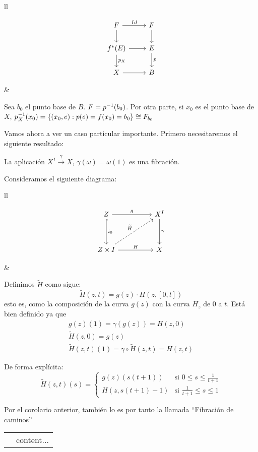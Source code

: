 \begin{tabular}{ll}
\begin{minipage}{0.3\textwidth}
\[
\begin{tikzcd}
F \rar{Id} \dar & F \dar \\
f^*(E) \rar \dar{p_X}  & E \dar{p} \\
X \rar & B
\end{tikzcd}
\]
\end{minipage}
&
\begin{minipage}{0.65\textwidth}
\begin{demo}
Sea $b_0$ el punto base de $B$. $F = \nobreak p^{-1}(b_0)$. Por otra parte, si $x_0$ es el punto base de $X$, $p_X^{-1}(x_0) = \nobreak \{ (x_0, e) : p(e) = f(x_0) = b_0\} \cong F_{b_0}$
\end{demo}
\end{minipage}
\end{tabular}
Vamos ahora a ver un caso particular importante. Primero necesitaremos el siguiente resultado:
\begin{prop}
La aplicación $X^I \stackrel{\gamma}{\longrightarrow} X$, $\gamma(\omega) = \omega(1)$ es una fibración.
\end{prop}
\begin{demo}
Consideramos el siguiente diagrama:\par
\begin{tabular}{ll}
\begin{minipage}{0.3\textwidth}
\[
\begin{tikzcd}
Z \arrow{rr}{g} \arrow[hook]{dd}{i_0} & & X^I \arrow{dd}{\gamma} \\
\\
Z \times I \arrow{rr}{H} \arrow[dashed]{uurr}{\widetilde{H}} & & X
\end{tikzcd}
\]
\end{minipage}
&
\begin{minipage}{0.65\textwidth}
Definimos $\widetilde{H}$ como sigue:
\[ \widetilde{H}(z,t) = g(z) \cdotp H(z, [0,t]) \]
esto es, como la composición de la curva $g(z)$ con la curva $H_z$ de $0$ a $t$. Está bien definido ya que
\begin{align*}
g(z)(1) = \gamma(g(z)) = H(z,0)\\
\widetilde{H}(z,0) = g(z) \\
\widetilde{H}(z,t)(1) = \gamma \circ \widetilde{H}(z,t) = H(z,t) \end{align*}
\end{minipage}
\end{tabular}
De forma explícita:
\[
\widetilde{H}(z,t)(s) = 
\begin{cases}
g(z)(s(t+1)) & \text{si } 0 \leq s \leq \frac{1}{t+1} \\
H(z, s(t+1) -1) & \text{si } \frac{1}{t+1} \leq s \leq 1
\end{cases}
\]
\end{demo}
Por el corolario anterior, también lo es por tanto la llamada ``Fibración de caminos'' \par
\begin{tabular}{ll}
\begin{minipage}{0.5\textwidth}

\end{minipage}
&
\begin{minipage}{0.5\textwidth}
content...
\end{minipage}
\end{tabular}